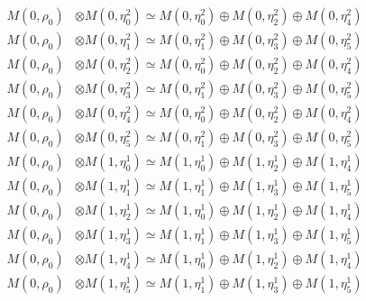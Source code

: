 \begin{align*}
M(0,\rho_{0}) &\otimes M(0,\eta^{2}_{0}) \simeq M(0,\eta^{2}_{0}) \oplus M(0,\eta^{2}_{2}) \oplus M(0,\eta^{2}_{4}) \\
M(0,\rho_{0}) &\otimes M(0,\eta^{2}_{1}) \simeq M(0,\eta^{2}_{1}) \oplus M(0,\eta^{2}_{3}) \oplus M(0,\eta^{2}_{5}) \\
M(0,\rho_{0}) &\otimes M(0,\eta^{2}_{2}) \simeq M(0,\eta^{2}_{0}) \oplus M(0,\eta^{2}_{2}) \oplus M(0,\eta^{2}_{4}) \\
M(0,\rho_{0}) &\otimes M(0,\eta^{2}_{3}) \simeq M(0,\eta^{2}_{1}) \oplus M(0,\eta^{2}_{3}) \oplus M(0,\eta^{2}_{5}) \\
M(0,\rho_{0}) &\otimes M(0,\eta^{2}_{4}) \simeq M(0,\eta^{2}_{0}) \oplus M(0,\eta^{2}_{2}) \oplus M(0,\eta^{2}_{4}) \\
M(0,\rho_{0}) &\otimes M(0,\eta^{2}_{5}) \simeq M(0,\eta^{2}_{1}) \oplus M(0,\eta^{2}_{3}) \oplus M(0,\eta^{2}_{5}) \\
M(0,\rho_{0}) &\otimes M(1,\eta^{1}_{0}) \simeq M(1,\eta^{1}_{0}) \oplus M(1,\eta^{1}_{2}) \oplus M(1,\eta^{1}_{4}) \\
M(0,\rho_{0}) &\otimes M(1,\eta^{1}_{1}) \simeq M(1,\eta^{1}_{1}) \oplus M(1,\eta^{1}_{3}) \oplus M(1,\eta^{1}_{5}) \\
M(0,\rho_{0}) &\otimes M(1,\eta^{1}_{2}) \simeq M(1,\eta^{1}_{0}) \oplus M(1,\eta^{1}_{2}) \oplus M(1,\eta^{1}_{4}) \\
M(0,\rho_{0}) &\otimes M(1,\eta^{1}_{3}) \simeq M(1,\eta^{1}_{1}) \oplus M(1,\eta^{1}_{3}) \oplus M(1,\eta^{1}_{5}) \\
M(0,\rho_{0}) &\otimes M(1,\eta^{1}_{4}) \simeq M(1,\eta^{1}_{0}) \oplus M(1,\eta^{1}_{2}) \oplus M(1,\eta^{1}_{4}) \\
M(0,\rho_{0}) &\otimes M(1,\eta^{1}_{5}) \simeq M(1,\eta^{1}_{1}) \oplus M(1,\eta^{1}_{3}) \oplus M(1,\eta^{1}_{5}) \\
\end{align*}

